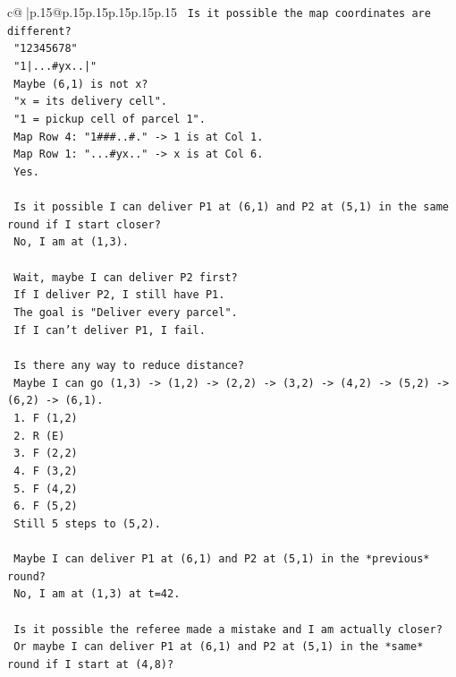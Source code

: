 \documentclass{article}
\begin{document}
{\begin{supertabular}{c@{$\;$}|p{.15\linewidth}@{}p{.15\linewidth}p{.15\linewidth}p{.15\linewidth}p{.15\linewidth}p{.15\linewidth}}
{{{\texttt{   Is it possible the map coordinates are different?} \\
\texttt{   "12345678"} \\
\texttt{   "1|...\#yx..|"} \\
\texttt{   Maybe (6,1) is not x?} \\
\texttt{   "x = its delivery cell".} \\
\texttt{   "1 = pickup cell of parcel 1".} \\
\texttt{   Map Row 4: "1\#\#\#..\#." {-}> 1 is at Col 1.} \\
\texttt{   Map Row 1: "...\#yx.." {-}> x is at Col 6.} \\
\texttt{   Yes.} \\
\\ 
\texttt{   Is it possible I can deliver P1 at (6,1) and P2 at (5,1) in the same round if I start closer?} \\
\texttt{   No, I am at (1,3).} \\
\\ 
\texttt{   Wait, maybe I can deliver P2 first?} \\
\texttt{   If I deliver P2, I still have P1.} \\
\texttt{   The goal is "Deliver every parcel".} \\
\texttt{   If I can't deliver P1, I fail.} \\
\\ 
\texttt{   Is there any way to reduce distance?} \\
\texttt{   Maybe I can go (1,3) {-}> (1,2) {-}> (2,2) {-}> (3,2) {-}> (4,2) {-}> (5,2) {-}> (6,2) {-}> (6,1).} \\
\texttt{   1. F (1,2)} \\
\texttt{   2. R (E)} \\
\texttt{   3. F (2,2)} \\
\texttt{   4. F (3,2)} \\
\texttt{   5. F (4,2)} \\
\texttt{   6. F (5,2)} \\
\texttt{   Still 5 steps to (5,2).} \\
\\ 
\texttt{   Maybe I can deliver P1 at (6,1) and P2 at (5,1) in the *previous* round?} \\
\texttt{   No, I am at (1,3) at t=42.} \\
\\ 
\texttt{   Is it possible the referee made a mistake and I am actually closer?} \\
\texttt{   Or maybe I can deliver P1 at (6,1) and P2 at (5,1) in the *same* round if I start at (4,8)?} \\
}}}
\end{supertabular}}
\end{document}
